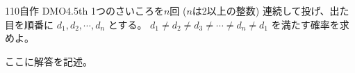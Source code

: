 \begin{thm}{110}{}{自作 DMO4.5th}
 1つのさいころを$n$回 ($n$は2以上の整数) 連続して投げ、出た目を順番に $d_1, d_2, \cdots, d_n$ とする。 $d_1\neq d_2 \neq d_3 \neq \cdots \neq d_n \neq d_1$ を満たす確率を求めよ。
\end{thm}

ここに解答を記述。